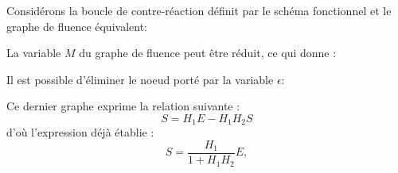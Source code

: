 Considérons la boucle de contre-réaction définit par le schéma fonctionnel et 
le graphe de fluence équivalent:
\begin{center}
    
\end{center}

La variable $M$ du graphe de fluence peut être réduit, ce qui donne :

\begin{center}
    
\end{center}

Il est possible d'éliminer le noeud porté par la variable $\epsilon$:

\begin{center}
    
\end{center}
Ce dernier graphe exprime la relation suivante :
$$
S=H_1E-H_1H_2S
$$
d'où l'expression déjà établie :
$$
    S=\dfrac{H_1}{1+H_1H_2}E,
$$

